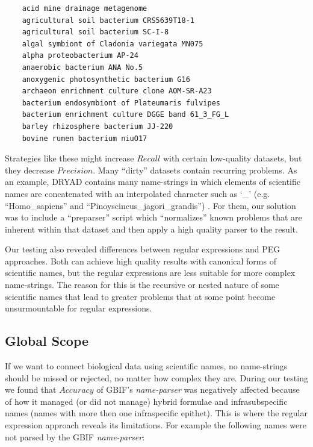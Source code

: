 \documentclass{bmcart}
\begin{document}
\begin{verbatim}
    acid mine drainage metagenome
    agricultural soil bacterium CRS5639T18-1
    agricultural soil bacterium SC-I-8
    algal symbiont of Cladonia variegata MN075
    alpha proteobacterium AP-24
    anaerobic bacterium ANA No.5
    anoxygenic photosynthetic bacterium G16
    archaeon enrichment culture clone AOM-SR-A23
    bacterium endosymbiont of Plateumaris fulvipes
    bacterium enrichment culture DGGE band 61_3_FG_L
    barley rhizosphere bacterium JJ-220
    bovine rumen bacterium niuO17
\end{verbatim}

\vspace{0.5cm}

Strategies like these might increase $Recall$ with certain low-quality datasets,
but they decrease $Precision$. Many
``dirty'' datasets contain recurring problems. As an example, DRYAD contains many name-strings in which elements of scientific names are concatenated with an interpolated character such as `\_’ (e.g. ``Homo\_sapiens'' and ``Pinoyscincus\_jagori\_grandis'') \cite{Patterson:inpress-a}. For them, our solution
was to include a ``preparser'' script which ``normalizes'' known problems that are inherent within that dataset and
then apply a high quality parser to the result.  

Our testing also revealed differences between regular expressions and PEG
approaches. Both can achieve high quality results with canonical forms of scientific names, but the
regular expressions are less suitable for more complex name-strings. The reason for this is the recursive or nested nature of some scientific names that lead to greater
problems that at some point become unsurmountable for regular expressions.

\subsection*{Global Scope}

If we want to connect biological data using scientific names, no name-strings
should be missed or rejected, no matter how complex they are. During our
testing we found that $Accuracy$ of GBIF's \textit{name-parser} was negatively
affected because of how it managed (or did not manage) hybrid formulae and infrasubspecific names (names
with more then one infraspecific epithet). This is where the regular expression approach reveals its limitations.  For example the following names were not parsed by the GBIF \textit{name-parser}:
\end{document}
